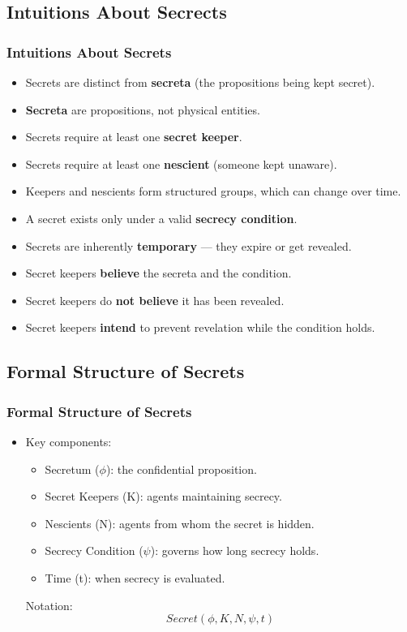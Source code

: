 \documentclass[aspectratio=169]{beamer}
\begin{document}
\subsection{Intuitions About Secrects}
\begin{frame}
\frametitle{Intuitions About Secrets}
\begin{itemize}
    \item Secrets are distinct from \textbf{secreta} (the propositions being kept secret).
    \item \textbf{Secreta} are propositions, not physical entities.
    \item Secrets require at least one \textbf{secret keeper}.
    \item Secrets require at least one \textbf{nescient} (someone kept unaware).
    \item Keepers and nescients form structured groups, which can change over time.
    \item A secret exists only under a valid \textbf{secrecy condition}.
    \item Secrets are inherently \textbf{temporary} — they expire or get revealed.
    \item Secret keepers \textbf{believe} the secreta and the condition.
    \item Secret keepers do \textbf{not believe} it has been revealed.
    \item Secret keepers \textbf{intend} to prevent revelation while the condition holds.
\end{itemize}
\end{frame}

\subsection{Formal Structure of Secrets}
\begin{frame}
\frametitle{Formal Structure of Secrets}
{\Large
\begin{itemize}
    \item Key components:
    \begin{itemize}
        \Large 
        \item Secretum ($\phi$): the confidential proposition.
        \item Secret Keepers (K): agents maintaining secrecy.
        \item Nescients (N): agents from whom the secret is hidden.
        \item Secrecy Condition ($\psi$): governs how long secrecy holds.
        \item Time (t): when secrecy is evaluated.
    \end{itemize}
    {\small
    \begin{block}{Notation:}
    \[
    Secret(\phi, K, N, \psi, t)
    \]
    \end{block}
    }
\end{itemize}
}
\end{frame}
\end{document}
